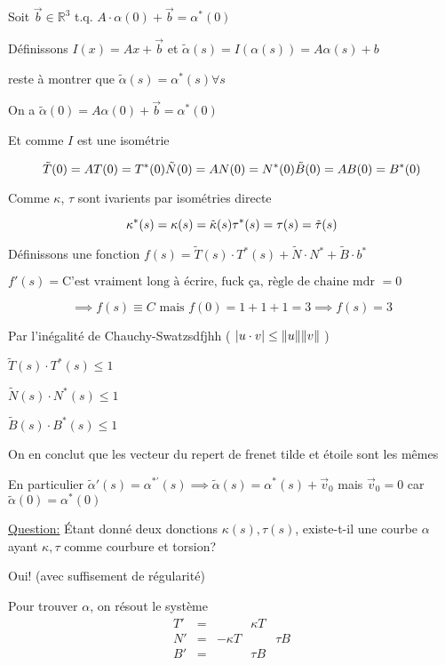 Soit $\vec b \in \mathbb{R}^3$ t.q. $A\cdot\alpha(0) + \vec b = \alpha^*(0)$

Définissons $I(x) = Ax +\vec b$ et $\tilde \alpha(s) = I(\alpha(s)) = A\alpha(s) + b$ 

reste à montrer que $\tilde \alpha(s) = \alpha^*(s) \forall s$ 

On a $\tilde \alpha(0) = A\alpha(0) + \vec b = \alpha^*(0)$ 

Et comme $I$ est une isométrie

$$\tilde T(0) = AT(0) = T^*(0)\\\tilde N(0)=AN(0)=N^*(0)\\\tilde B(0)=AB(0)=B^*(0)$$ 

Comme $\kappa$, $\tau$ sont ivarients par isométries directe

$$\kappa^*(s) = \kappa(s)= \tilde \kappa(s)\\\tau^*(s) = \tau(s)= \tilde \tau(s)$$ 

Définissons une fonction $f(s) = \tilde T(s)\cdot T^*(s)+\tilde N\cdot N^*+\tilde B\cdot b^*$ 

$f'(s)= \text{C'est vraiment long à écrire, fuck ça, règle de chaine mdr }= 0$ 

$$\implies f(s) \equiv C \text{ mais } f(0)=1+1+1=3 \implies f(s) = 3$$ 

Par l'inégalité de Chauchy-Swatzsdfjhh ( $|u\cdot v| \leq \norm{u}\norm{v}$ )



$\tilde T(s)\cdot T^*(s) \leq 1$

$\tilde N(s)\cdot N^*(s) \leq 1$

$\tilde B(s)\cdot B^*(s) \leq 1$

On en conclut que les vecteur du repert de frenet tilde et étoile sont les mêmes

En particulier $\tilde \alpha'(s) = \alpha^{*\prime}(s) \implies \tilde \alpha(s) = \alpha^*(s) + \vec v_{0}$ mais $\vec v_{0} = 0$ car $\tilde \alpha(0) = \alpha^*(0)$

\underline{Question:} Étant donné deux donctions $\kappa(s), \tau(s)$, existe-t-il une courbe $\alpha$ ayant $\kappa,\tau$ comme courbure et torsion?

Oui! (avec suffisement de régularité)

Pour trouver $\alpha$, on résout le système
$$
\begin{matrix}
T' &= & &\kappa T\\
N' &= &-\kappa T & &\tau B\\
B' &= & & \tau B
\end{matrix}
$$

